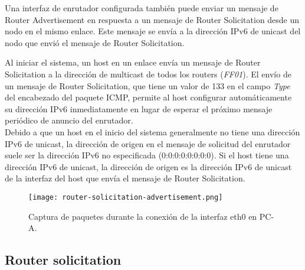 \documentclass[osajnl,twocolumn,showpacs,superscriptaddress,10pt]{revtex4-1} %
\begin{document}
Una interfaz de enrutador configurada también puede enviar un mensaje de Router Advertisement en respuesta a un mensaje 
de Router Solicitation desde un nodo en el mismo enlace. Este mensaje se envía a la dirección IPv6 de unicast del nodo 
que envió el mensaje de Router Solicitation.

Al iniciar el sistema, un host en un enlace envía un mensaje de Router Solicitation a la dirección de multicast de todos 
los routers (\textit{FF01}). El envío de un mensaje de Router Solicitation, que tiene un valor de 133 en el 
campo \textit{Type} del encabezado del paquete ICMP, permite al host configurar automáticamente su dirección IPv6 
inmediatamente en lugar de esperar el próximo mensaje periódico de anuncio del enrutador. \\

Debido a que un host en el inicio del sistema generalmente no tiene una dirección IPv6 de unicast, la dirección de origen 
en el mensaje de solicitud del enrutador suele ser la dirección IPv6 no especificada (0:0:0:0:0:0:0:0). 
Si el host tiene una dirección IPv6 de unicast, la dirección de origen es la dirección IPv6 de unicast 
de la interfaz del host que envía el mensaje de Router Solicitation. \\

\begin{figure}[H]
    \centering
    \texttt{[image: router-solicitation-advertisement.png]}
    \caption{Captura de paquetes durante la conexión de la interfaz eth0 en PC-A.}
    \label{image:router-solicitation-advertisement}
\end{figure}

\subsection{Router solicitation} 
\end{document}
